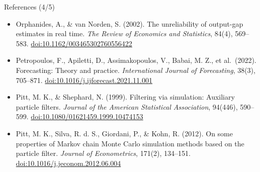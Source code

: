 \begin{frame}{References (4/5)}
\begin{itemize}
    \item Orphanides, A., \& van Norden, S. (2002). The unreliability of output-gap estimates in real time. \textit{The Review of Economics and Statistics}, 84(4), 569--583. \href{https://doi.org/10.1162/003465302760556422}{doi:10.1162/003465302760556422}
    \item Petropoulos, F., Apiletti, D., Assimakopoulos, V., Babai, M. Z., et al.\ (2022). Forecasting: Theory and practice. \textit{International Journal of Forecasting}, 38(3), 705--871. \href{https://doi.org/10.1016/j.ijforecast.2021.11.001}{doi:10.1016/j.ijforecast.2021.11.001}
    \item Pitt, M. K., \& Shephard, N. (1999). Filtering via simulation: Auxiliary particle filters. \textit{Journal of the American Statistical Association}, 94(446), 590--599. \href{https://doi.org/10.1080/01621459.1999.10474153}{doi:10.1080/01621459.1999.10474153}
    \item Pitt, M. K., Silva, R. d. S., Giordani, P., \& Kohn, R. (2012). On some properties of Markov chain Monte Carlo simulation methods based on the particle filter. \textit{Journal of Econometrics}, 171(2), 134--151. \href{https://doi.org/10.1016/j.jeconom.2012.06.004}{doi:10.1016/j.jeconom.2012.06.004}
\end{itemize}
\end{frame}

